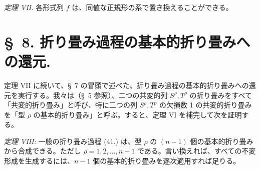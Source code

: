\documentclass[11pt]{article}
\begin{document}
\emph{定理 VII.} 各形式列 $f$ は、同値な正規形の系で置き換えることができる。

\section*{\S\ 8. 折り畳み過程の基本的折り畳みへの還元.}
定理 VII に続いて、\S\ 7 の冒頭で述べた、折り畳み過程の基本的折り畳みへの還元を実行する。我々は（\S\ 5 参照）、二つの共変的列 $S^\rho,T^\rho$ の折り畳みをすべて「共変的折り畳み」と呼び、特に二つの列 $S^\rho,T^\rho$ の欠損数 1 の共変的折り畳みを「型 $\rho$ の基本的折り畳み」と呼ぶ。すると、定理 VI を補完して次を証明する。

\emph{定理 VIII:} 一般の折り畳み過程 (41.) は、型 $\rho$ の $(n-1)$ 個の基本的折り畳みから合成できる。ただし $\rho=1,2,\ldots,n-1$ である。言い換えれば、すべての不変形成を生成するには、$n-1$ 個の基本的折り畳みを逐次適用すれば足りる。
\end{document}
